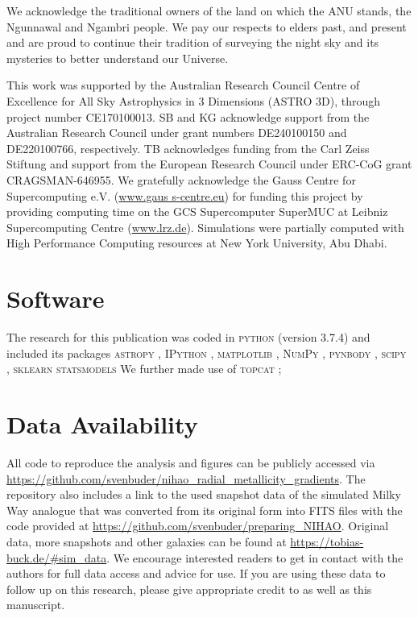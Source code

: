 \documentclass[twocolumn,apj,numberedappendix,appendixfloats,twocolappendix]{openjournal}
\begin{document}
\begin{CJK*}{UTF8}{gbsn}
We acknowledge the traditional owners of the land on which the ANU stands, the Ngunnawal and Ngambri people. We pay our respects to elders past, and present and are proud to continue their tradition of surveying the night sky and its mysteries to better understand our Universe.

This work was supported by the Australian Research Council Centre of Excellence for All Sky Astrophysics in 3 Dimensions (ASTRO 3D), through project number CE170100013. SB and KG acknowledge support from the Australian Research Council under grant numbers DE240100150 and DE220100766, respectively. TB acknowledges funding from the Carl Zeiss Stiftung and support from the European Research Council under ERC-CoG grant CRAGSMAN-646955. We gratefully acknowledge the Gauss Centre for Supercomputing e.V. (\url{www.gaus s-centre.eu}) for funding this project by providing computing time on the GCS Supercomputer SuperMUC at Leibniz Supercomputing Centre (\url{www.lrz.de}). Simulations were partially computed with High Performance Computing resources at New York University, Abu Dhabi.

\section*{Software}

The research for this publication was coded in \textsc{python} (version 3.7.4) and included its packages
\textsc{astropy} \citep[v. 3.2.2;][]{Robitaille2013,PriceWhelan2018},
\textsc{IPython} \citep[v. 7.8.0;][]{ipython},
\textsc{matplotlib} \citep[v. 3.1.3;][]{matplotlib},
\textsc{NumPy} \citep[v. 1.17.2;][]{numpy},
\textsc{pynbody} \citep[v. 1.1.0;][]{pynbody},
\textsc{scipy} \citep[v. 1.3.1;][]{Scipy},
\textsc{sklearn} \citep[v. 1.5.1][]{scikit-learn}
\textsc{statsmodels} \citep[v. 0.14.2][]{statsmodels}
We further made use of \textsc{topcat} \citep[version 4.7;][]{Taylor2005};

\section*{Data Availability}

All code to reproduce the analysis and figures can be publicly accessed via \url{https://github.com/svenbuder/nihao_radial_metallicity_gradients}. The repository also includes a link to the used snapshot data of the simulated Milky Way analogue that was converted from its original form into FITS files with the code provided at \url{https://github.com/svenbuder/preparing_NIHAO}. Original data, more snapshots and other galaxies can be found at \url{https://tobias-buck.de/#sim_data}. We encourage interested readers to get in contact with the authors for full data access and advice for use. If you are using these data to follow up on this research, please give appropriate credit to \citet{Buck2020b, Buck2021} as well as this manuscript.

\end{CJK*}



\end{document}
